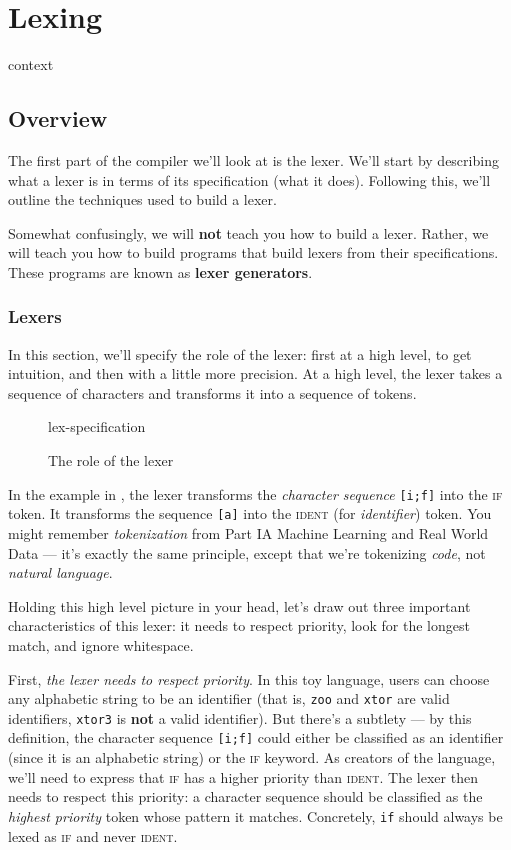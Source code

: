 \chapter{Lexing}

\begin{center}
{context}
\end{center}

\section{Overview}
The first part of the compiler we'll look at is the lexer. We'll start by describing what a lexer is in terms of its specification (what it does). Following this, we'll outline the techniques used to build a lexer.

Somewhat confusingly, we will \textbf{not} teach you how to build a lexer. Rather, we will teach you how to build programs that build lexers from their specifications. These programs are known as \textbf{lexer generators}.

\subsection{Lexers}
In this section, we'll specify the role of the lexer: first at a high level, to get intuition, and then with a little more precision. At a high level, the lexer takes a sequence of characters and transforms it into a sequence of tokens.  

\begin{figure}[H]
\centering
{lex-specification}
\caption{The role of the lexer}
\label{fig:lex-specification}
\end{figure}

In the example in , the lexer transforms the \emph{character sequence} \texttt{[i;f]} into the \textsc{if} token. It transforms the sequence \texttt{[a]} into the \textsc{ident} (for \emph{identifier}) token. You might remember \emph{tokenization} from {\sffamily Part IA Machine Learning and Real World Data} --- it's exactly the same principle, except that we're tokenizing \textit{code}, not \textit{natural language}. 

Holding this high level picture in your head, let's draw out three important characteristics of this lexer: it needs to respect priority, look for the longest match, and ignore whitespace.

First, \emph{the lexer needs to respect priority}. In this toy language, users can choose any alphabetic string to be an identifier (that is, \texttt{zoo} and \texttt{xtor} are valid identifiers, \texttt{xtor3} is \textbf{not} a valid identifier). But there's a subtlety --- by this definition, the character sequence \texttt{[i;f]} could either be classified as an identifier (since it is an alphabetic string) or the \textsc{if} keyword. As creators of the language, we'll need to express that \textsc{if} has a higher priority than \textsc{ident}. The lexer then needs to respect this priority: a character sequence should be classified as the \textit{highest priority} token whose pattern it matches. Concretely, \texttt{if} should always be lexed as \textsc{if} and never \textsc{ident}. 


